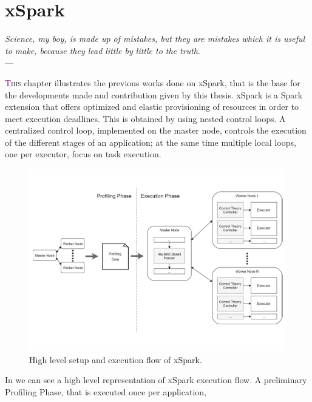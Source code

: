 \chapter{xSpark} \label{chap:xSpark}
\begin{flushright}{\slshape    
   Science, my boy, is made up of mistakes, but they are mistakes
   which it is useful to make, because they lead little by little
   to the truth}. \\ \medskip --- \citeauthor{verne_journey:1957}
    \citeyear{verne_journey:1957}
\end{flushright} 
\lettrine[lines=4]{\textcolor{purple}{T}}{his} chapter illustrates the previous works done on xSpark, that is the base for the developments made and contribution given by this thesis.
xSpark is a Spark extension that offers optimized and elastic provisioning
of resources in order to meet execution deadlines. This is
obtained by using nested control loops. A centralized control loop,
implemented on the master node, controls the execution of the different
stages of an application; at the same time multiple local loops, one per
executor, focus on task execution.
\begin{figure}
	\centering
	\includegraphics[width=\columnwidth]{Images/xspark_execution_flow.pdf}  
	\caption[xSpark high level setup and execution flow]{High level setup and execution flow of xSpark.}
	\label{fig:xSparkExecFlow}
\end{figure}
In  we can see a high level representation of xSpark execution flow. A preliminary Profiling Phase, that is executed once per application,
